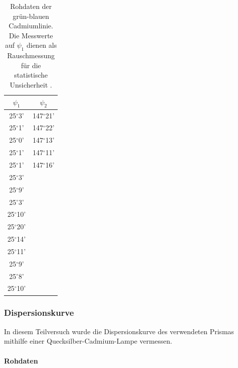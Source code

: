 \documentclass[12pt,a4paper]{article}
\begin{document}
\begin{table}
\begin{center}
\begin{tabular}{|c|c|}
\hline 
$\psi_1$ & $\psi_2$ \\ 
\hline 
25$^{\circ}$3' & 147$^{\circ}$21' \\ 
\hline 
25$^{\circ}$1' & 147$^{\circ}$22' \\ 
\hline 
25$^{\circ}$0'& 147$^{\circ}$13' \\ 
\hline 
25$^{\circ}$1' & 147$^{\circ}$11' \\ 
\hline 
25$^{\circ}$1' & 147$^{\circ}$16' \\ 
\hline 
25$^{\circ}$3' & \\ 
\hline 
25$^{\circ}$9' & \\ 
\hline 
25$^{\circ}$3' & \\ 
\hline 
25$^{\circ}$10' & \\ 
\hline 
25$^{\circ}$20' & \\ 
\hline 
25$^{\circ}$14' & \\ 
\hline 
25$^{\circ}$11' & \\ 
\hline 
25$^{\circ}$9' & \\ 
\hline 
25$^{\circ}$8' & \\ 
\hline 
25$^{\circ}$10' & \\ 
\hline 

\end{tabular} 

\caption{Rohdaten der grün-blauen Cadmiumlinie. Die Messwerte auf $\psi_1$ dienen als Rauschmessung für die statistische Unsicherheit .}
\label{tab:RauschenPrisma}
\end{center}
\end{table}


\subsubsection{Dispersionskurve}
In diesem Teilversuch wurde die Dispersionskurve des verwendeten Prismas mithilfe einer Quecksilber-Cadmium-Lampe vermessen.


\paragraph{Rohdaten}
\end{document}
